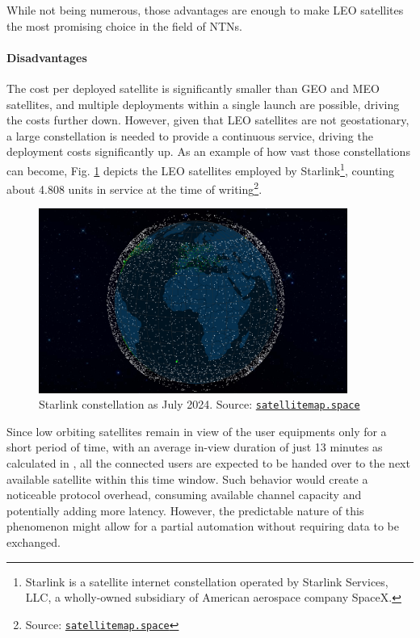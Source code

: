 While not being numerous, those advantages are enough to make \ac{LEO} satellites the most promising choice in the field of \ac{NTN}s.

\paragraph{Disadvantages}
The cost per deployed satellite is significantly smaller than \ac{GEO} and \ac{MEO} satellites, and multiple deployments within a single launch are possible, driving the costs further down. However, given that \ac{LEO} satellites are not geostationary, a large constellation is needed to provide a continuous service, driving the deployment costs significantly up. As an example of how vast those constellations can become, Fig. \ref{fig:starlink_constellation} depicts the \ac{LEO} satellites employed by Starlink\footnote{Starlink is a satellite internet constellation operated by Starlink Services, LLC, a wholly-owned subsidiary of American aerospace company SpaceX.}, counting about 4.808 units in service at the time of writing\footnote{Source: \href{https://satellitemap.space/}{\texttt{satellitemap.space}}}.

\begin{figure}[ht]
    \centering
    \includegraphics[width=0.9\textwidth]{res/starlink-constellation.png}
    \caption{Starlink constellation as July 2024. Source: \href{https://satellitemap.space/}{\texttt{satellitemap.space}}}
    \label{fig:starlink_constellation}
\end{figure}

Since low orbiting satellites remain in view of the user equipments only for a short period of time, with an average in-view duration of just 13 minutes as calculated in \cite{regional-coverage-analysis-leo}, all the connected users are expected to be handed over to the next available satellite within this time window. Such behavior would create a noticeable protocol overhead, consuming available channel capacity and potentially adding more latency. However, the predictable nature of this phenomenon might allow for a partial automation without requiring data to be exchanged.

